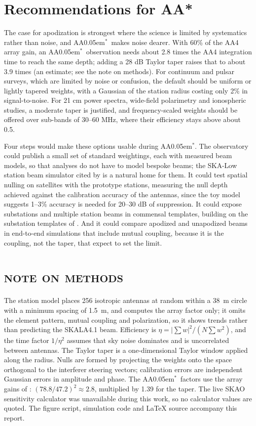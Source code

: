 \documentclass[11pt,a4paper]{article}
\newcommand{\AAstar}{AA\kern0.05em$^{*}$}
\begin{document}
\section{Recommendations for AA*}

The case for apodization is strongest where the science is limited by systematics rather than noise, and \AAstar\ makes noise dearer. With 60\% of the AA4 array gain, an \AAstar\ observation needs about 2.8 times the AA4 integration time to reach the same depth; adding a 28 dB Taylor taper raises that to about 3.9 times (an estimate; see the note on methods). For continuum and pulsar surveys, which are limited by noise or confusion, the default should be uniform or lightly tapered weights, with a Gaussian of the station radius costing only 2\% in signal-to-noise. For 21 cm power spectra, wide-field polarimetry and ionospheric studies, a moderate taper is justified, and frequency-scaled weights should be offered over sub-bands of 30--60 MHz, where their efficiency stays above about 0.5.

Four steps would make these options usable during \AAstar. The observatory could publish a small set of standard weightings, each with measured beam models, so that analyses do not have to model bespoke beams; the SKA-Low station beam simulator cited by \citet{Datta2026} is a natural home for them. It could test spatial nulling on satellites with the prototype stations, measuring the null depth achieved against the calibration accuracy of the antennas, since the toy model suggests 1--3\% accuracy is needed for 20--30 dB of suppression. It could expose substations and multiple station beams in commensal templates, building on the substation templates of \citet{Trott2024}. And it could compare apodized and unapodized beams in end-to-end simulations that include mutual coupling, because it is the coupling, not the taper, that \citet{deLeraAcedo2026} expect to set the limit.

\section*{\scshape note on methods}
\small
The station model places 256 isotropic antennas at random within a \SI{38}{\metre} circle with a minimum spacing of \SI{1.5}{\metre}, and computes the array factor only; it omits the element pattern, mutual coupling and polarization, so it shows trends rather than predicting the SKALA4.1 beam. Efficiency is $\eta=|\sum w|^{2}/(N\sum w^{2})$, and the time factor $1/\eta^{2}$ assumes that sky noise dominates and is uncorrelated between antennas. The Taylor taper is a one-dimensional Taylor window applied along the radius. Nulls are formed by projecting the weights onto the space orthogonal to the interferer steering vectors; calibration errors are independent Gaussian errors in amplitude and phase. The \AAstar\ factors use the array gains of \citet{Keane2026}: $(78.8/47.2)^{2}\approx2.8$, multiplied by 1.39 for the taper. The live SKAO sensitivity calculator was unavailable during this work, so no calculator values are quoted. The figure script, simulation code and LaTeX source accompany this report.
\end{document}
